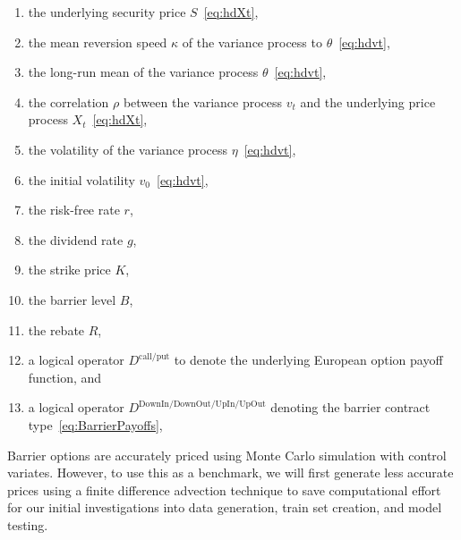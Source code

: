 \documentclass[11pt]{article}
\begin{document}
		\begin{enumerate}
			\item the underlying security price $S$~\eqref{eq:hdXt}, 
			\item the mean reversion speed $\kappa$ of the variance process to $\theta$~\eqref{eq:hdvt}, 
			\item the long-run mean of the variance process $\theta$~\eqref{eq:hdvt}, 
			\item the correlation $\rho$ between the variance process $v_t$ and the underlying price process $X_t$~\eqref{eq:hdXt}, 
			\item the volatility of the variance process $\eta$~\eqref{eq:hdvt}, 
			\item the initial volatility $v_{0}$~\eqref{eq:hdvt}, 
			\item the risk-free rate $r$, 
			\item the dividend rate $g$, 
			\item the strike price $K$, 
			\item the barrier level $B$, 
			\item the rebate $R$, 
			\item a logical operator $D^{\text{call/put}}$ to denote the underlying European option payoff function, and
			\item a logical operator $D^{\text{DownIn/DownOut/UpIn/UpOut}}$ denoting the barrier contract type~\eqref{eq:BarrierPayoffs},
		\end{enumerate}
		\vfill
		Barrier options are accurately priced using Monte Carlo simulation with control variates. However, to use this as a benchmark, we will first generate less accurate prices using a finite difference advection technique to save computational effort for our initial investigations into data generation, train set creation, and model testing.
		\vfill
		
	\newpage
	
\end{document}
